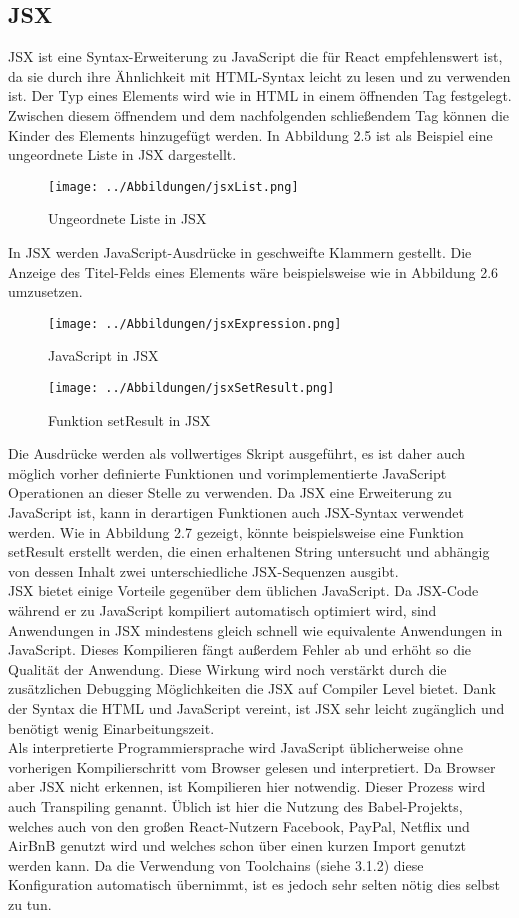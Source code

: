\subsection{JSX}
JSX ist eine Syntax-Erweiterung zu JavaScript die für React empfehlenswert ist, da sie durch ihre Ähnlichkeit mit HTML-Syntax leicht zu lesen und zu verwenden ist. Der Typ eines Elements wird wie in HTML in einem öffnenden Tag festgelegt. Zwischen diesem öffnendem und dem nachfolgenden schließendem Tag können die Kinder des Elements hinzugefügt werden. In Abbildung 2.5 ist als Beispiel eine ungeordnete Liste in JSX dargestellt.
\begin{figure}[!thb]
     \centerline{\texttt{[image: ../Abbildungen/jsxList.png]}}
  \caption{Ungeordnete Liste in JSX}
  \label{Ungeordnete Liste in JSX}
\end{figure}
In JSX werden JavaScript-Ausdrücke in geschweifte Klammern gestellt. Die Anzeige des Titel-Felds eines Elements wäre beispielsweise wie in Abbildung 2.6 umzusetzen.\\ 
\begin{figure}[H]
     \centerline{\texttt{[image: ../Abbildungen/jsxExpression.png]}}
  \caption{JavaScript in JSX}
  \label{JavaScript in JSX}
  \centerline{}
     \centerline{\texttt{[image: ../Abbildungen/jsxSetResult.png]}}
  \caption{Funktion setResult in JSX}
  \label{Funktion setResult in JSX}
\end{figure}
Die Ausdrücke werden als vollwertiges Skript ausgeführt, es ist daher auch möglich vorher definierte Funktionen und vorimplementierte JavaScript Operationen an dieser Stelle zu verwenden. Da JSX eine Erweiterung zu JavaScript ist, kann in derartigen Funktionen auch JSX-Syntax verwendet werden. Wie in Abbildung 2.7 gezeigt, könnte beispielsweise eine Funktion setResult erstellt werden, die einen erhaltenen String untersucht und abhängig von dessen Inhalt zwei unterschiedliche JSX-Sequenzen ausgibt. \\
JSX bietet einige Vorteile gegenüber dem üblichen JavaScript. Da JSX-Code während er zu JavaScript kompiliert automatisch optimiert wird, sind Anwendungen in JSX mindestens gleich schnell wie equivalente Anwendungen in JavaScript. Dieses Kompilieren fängt außerdem Fehler ab und erhöht so die Qualität der Anwendung. Diese Wirkung wird noch verstärkt durch die zusätzlichen Debugging Möglichkeiten die JSX auf Compiler Level bietet. Dank der Syntax die HTML und JavaScript vereint, ist JSX sehr leicht zugänglich und benötigt wenig Einarbeitungszeit. \\
Als interpretierte Programmiersprache wird JavaScript üblicherweise ohne vorherigen Kompilierschritt vom Browser gelesen und interpretiert. Da Browser aber JSX nicht erkennen, ist Kompilieren hier notwendig. Dieser Prozess wird auch Transpiling genannt. Üblich ist hier die Nutzung des Babel-Projekts, welches auch von den großen React-Nutzern Facebook, PayPal, Netflix und AirBnB genutzt wird und welches schon über einen kurzen Import genutzt werden kann. Da die Verwendung von Toolchains (siehe 3.1.2) diese Konfiguration automatisch übernimmt, ist es jedoch sehr selten nötig dies selbst zu tun.\\
